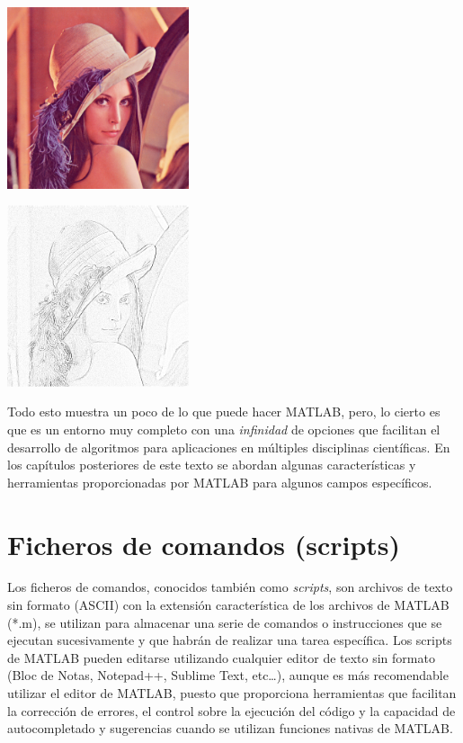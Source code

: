 \begin{center}
\includegraphics[width=0.4\textwidth]{images/ch1/lena.png}
\label{fig:lena}
\end{center}

\begin{center}
\includegraphics[width=0.4\textwidth]{images/ch1/lena_mod.png}
\label{fig:lena_mod}
\end{center}

Todo esto muestra un poco de lo que puede hacer MATLAB, pero, lo cierto
es que es un entorno muy completo con una \emph{infinidad} de opciones
que facilitan el desarrollo de algoritmos para aplicaciones en múltiples
disciplinas científicas. En los capítulos posteriores de este texto se
abordan algunas características y herramientas proporcionadas por MATLAB
para algunos campos específicos.

\section{Ficheros de comandos (scripts)}

Los ficheros de comandos, conocidos también como \emph{scripts}, son
archivos de texto sin formato (ASCII) con la extensión característica de
los archivos de MATLAB (*.m), se utilizan para almacenar una serie de
comandos o instrucciones que se ejecutan sucesivamente y que habrán de
realizar una tarea específica. Los scripts de MATLAB pueden editarse
utilizando cualquier editor de texto sin formato (Bloc de Notas,
Notepad++, Sublime Text, etc\ldots{}), aunque es más recomendable
utilizar el editor de MATLAB, puesto que proporciona herramientas que
facilitan la corrección de errores, el control sobre la ejecución del
código y la capacidad de autocompletado y sugerencias cuando se utilizan
funciones nativas de MATLAB.\\

